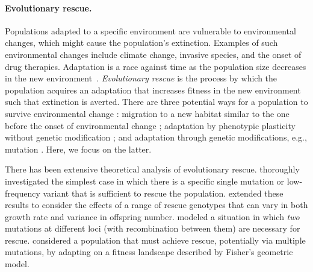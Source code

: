 \documentclass[12pt]{extarticle}
\begin{document}
\paragraph{Evolutionary rescue.} Populations adapted to a specific environment are vulnerable to environmental changes, which might cause the population's extinction. Examples of such environmental changes include climate change, invasive species, and the onset of drug therapies. Adaptation is a race against time as the population size decreases in the new environment~\citep{tanaka2022surviving}. 
\emph{Evolutionary rescue} is the process by which the population acquires an adaptation that increases fitness in the new environment such that extinction is averted.
There are three potential ways for a population to survive environmental change \citep{alexander2014evolutionary,bell2017evolutionary}: %
migration to a new habitat similar to the one before the onset of environmental change \citep{harsch2014keeping,cobbold2020should,zhou2022range}; 
adaptation by phenotypic plasticity without genetic modification \citep{carja2019evolutionary,carja2017evolutionary,levien2021non,gunnarsson2020understanding}; 
and adaptation through genetic modifications, e.g., mutation \citep{gomulkiewicz1995does,uecker2014evolutionary,uecker2016role,uecker2011fixation,orr2014population}. 
Here, we focus on the latter. 

There has been extensive theoretical analysis of evolutionary rescue.
\citet{orr2008population,orr2014population} thoroughly investigated the simplest case in which there is a specific single mutation or low-frequency variant that is sufficient to rescue the population. 
\citet{martin2013probability} extended these results to consider the effects of a range of rescue genotypes that can vary in both growth rate and variance in offspring number.
\citet{uecker2016role} modeled a situation in which \textit{two} mutations at different loci (with recombination between them) are necessary for rescue. 
\citet{osmond_genetic_2020} considered a population that must achieve rescue, potentially via multiple mutations, by adapting on a fitness landscape described by Fisher's geometric model. 
\end{document}
